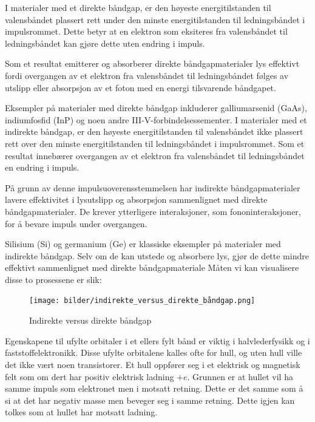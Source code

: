 \documentclass{article}
\begin{document}
I materialer med et direkte båndgap, er den høyeste energitilstanden til valensbåndet plassert rett under den minste energitilstanden til ledningsbåndet i impulsrommet. Dette betyr at en elektron som eksiteres fra valensbåndet til ledningsbåndet kan gjøre dette uten endring i impuls.

Som et resultat emitterer og absorberer direkte båndgapmaterialer lys effektivt fordi overgangen av et elektron fra valensbåndet til ledningsbåndet følges av utslipp eller absorpsjon av et foton med en energi tilsvarende båndgapet.

Eksempler på materialer med direkte båndgap inkluderer galliumarsenid (GaAs), indiumfosfid (InP) og noen andre III-V-forbindelsessementer.
I materialer med et indirekte båndgap, er den høyeste energitilstanden til valensbåndet ikke plassert rett over den minste energitilstanden til ledningsbåndet i impulsrommet. Som et resultat innebærer overgangen av et elektron fra valensbåndet til ledningsbåndet en endring i impuls.

På grunn av denne impulsuoverensstemmelsen har indirekte båndgapmaterialer lavere effektivitet i lysutslipp og absorpsjon sammenlignet med direkte båndgapmaterialer. De krever ytterligere interaksjoner, som fononinteraksjoner, for å bevare impuls under overgangen.

Silisium (Si) og germanium (Ge) er klassiske eksempler på materialer med indirekte båndgap. Selv om de kan utstede og absorbere lys, gjør de dette mindre effektivt sammenlignet med direkte båndgapmateriale
Måten vi kan visualisere disse to prosessene er slik:
\begin{figure}[H]
    \centering
    \texttt{[image: bilder/indirekte\_versus\_direkte\_båndgap.png]}
    \caption{Indirekte versus direkte båndgap}
    \label{fig:indirekte_versus_direkte_båndgap}
\end{figure}
Egenskapene til ufylte orbitaler i et ellers fylt bånd er viktig i halvlederfysikk og i faststoffelektronikk. Disse ufylte orbitalene kalles ofte for hull, og uten hull ville det ikke vært noen transistorer. Et hull oppfører seg i et elektrisk og magnetisk felt som om dert har positiv elektrisk ladning $+e$. Grunnen er at hullet vil ha samme impuls som elektronet men i motsatt retning. Dette er det samme som å si at det har negativ masse men beveger seg i samme retning. Dette igjen kan tolkes som at hullet har motsatt ladning.
\end{document}
